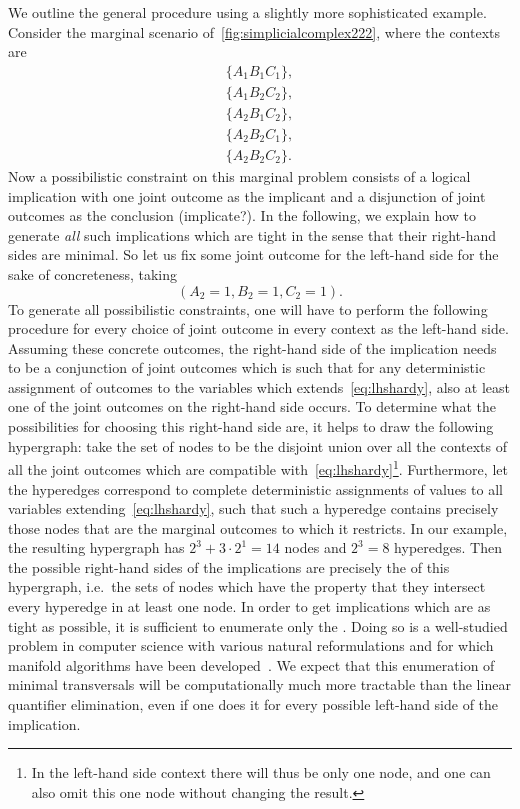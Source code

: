 We outline the general procedure using a slightly more sophisticated example. Consider the marginal scenario of~\cref{fig:simplicialcomplex222}, where the contexts are
\begin{align*}
	\{A_1 B_1 C_1\},\\
	\{A_1 B_2 C_2\},\\
	\{A_2 B_1 C_2\},\\
	\{A_2 B_2 C_1\},\\
	\{A_2 B_2 C_2\}.
\end{align*}
Now a possibilistic constraint on this marginal problem consists of a logical implication with one joint outcome as the implicant and a disjunction of joint outcomes as the conclusion (implicate?). In the following, we explain how to generate \emph{all} such implications which are tight in the sense that their right-hand sides are minimal. So let us fix some joint outcome for the left-hand side for the sake of concreteness, taking
\begin{equation}
	\label{eq:lhshardy}
	(A_2 = 1, B_2 = 1, C_2 = 1).
\end{equation}
To generate all possibilistic constraints, one will have to perform the following procedure for every choice of joint outcome in every context as the left-hand side. Assuming these concrete outcomes, the right-hand side of the implication needs to be a conjunction of joint outcomes which is such that for any deterministic assignment of outcomes to the variables which extends~\cref{eq:lhshardy}, also at least one of the joint outcomes on the right-hand side occurs. To determine what the possibilities for choosing this right-hand side are, it helps to draw the following hypergraph: take the set of nodes to be the disjoint union over all the contexts of all the joint outcomes which are compatible with~\eqref{eq:lhshardy}\footnote{In the left-hand side context there will thus be only one node, and one can also omit this one node without changing the result.}. Furthermore, let the hyperedges correspond to complete deterministic assignments of values to all variables extending~\cref{eq:lhshardy}, such that such a hyperedge contains precisely those nodes that are the marginal outcomes to which it restricts. In our example, the resulting hypergraph has $2^3 + 3\cdot 2^1 = 14$ nodes and $2^3 = 8$ hyperedges. Then the possible right-hand sides of the implications are precisely the  of this hypergraph, i.e.~the sets of nodes which have the property that they intersect every hyperedge in at least one node. In order to get implications which are as tight as possible, it is sufficient to enumerate only the . Doing so is a well-studied problem in computer science with various natural reformulations and for which manifold algorithms have been developed~\cite{eiter_dualization_2008}. We expect that this enumeration of minimal transversals will be computationally much more tractable than the linear quantifier elimination, even if one does it for every possible left-hand side of the implication.


